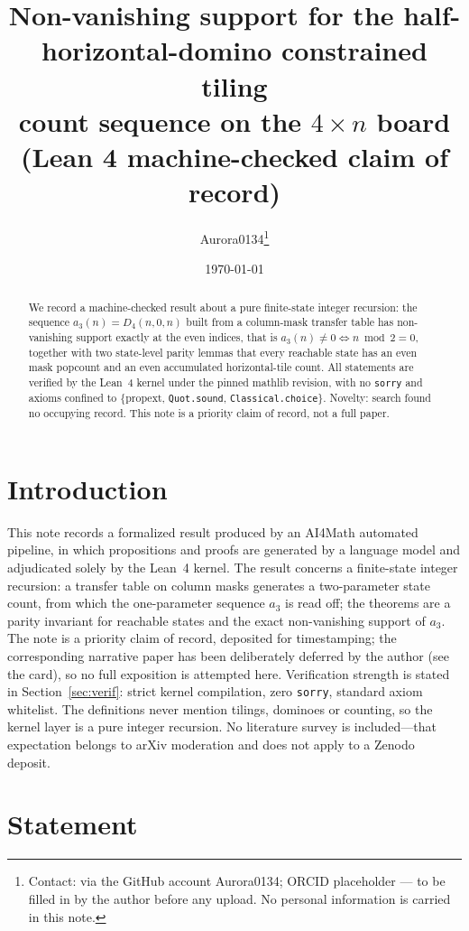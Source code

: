 \documentclass[11pt]{article}
\title{Non-vanishing support for the half-horizontal-domino constrained tiling\\
count sequence on the $4\times n$ board\\
{\large (Lean 4 machine-checked claim of record)}}
\author{Aurora0134\thanks{Contact: via the GitHub account Aurora0134; ORCID
placeholder --- to be filled in by the author before any upload. No personal
information is carried in this note.}}
\date{\today}
\begin{document}
\maketitle

\begin{abstract}
We record a machine-checked result about a pure finite-state integer recursion: the
sequence $a_3(n) = D_4(n,0,n)$ built from a column-mask transfer table has non-vanishing
support exactly at the even indices, that is $a_3(n) \neq 0 \iff n \bmod 2 = 0$, together
with two state-level parity lemmas that every reachable state has an even mask popcount and
an even accumulated horizontal-tile count. All statements are verified by the Lean~4 kernel
under the pinned mathlib revision, with no \texttt{sorry} and axioms confined to
\{propext, \texttt{Quot.sound}, \texttt{Classical.choice}\}. Novelty: search found no
occupying record. This note is a priority claim of record, not a full paper.
\end{abstract}

\section{Introduction}
This note records a formalized result produced by an AI4Math automated pipeline, in which
propositions and proofs are generated by a language model and adjudicated solely by the
Lean~4 kernel. The result concerns a finite-state integer recursion: a transfer table on
column masks generates a two-parameter state count, from which the one-parameter sequence
$a_3$ is read off; the theorems are a parity invariant for reachable states and the exact
non-vanishing support of $a_3$. The note is a priority claim of record, deposited for
timestamping; the corresponding narrative paper has been deliberately deferred by the author
(see the card), so no full exposition is attempted here. Verification strength is stated in
Section~\ref{sec:verif}: strict kernel compilation, zero \texttt{sorry}, standard axiom
whitelist. The definitions never mention tilings, dominoes or counting, so the kernel layer
is a pure integer recursion. No literature survey is included---that expectation belongs to
arXiv moderation and does not apply to a Zenodo deposit.

\section{Statement}
\end{document}
